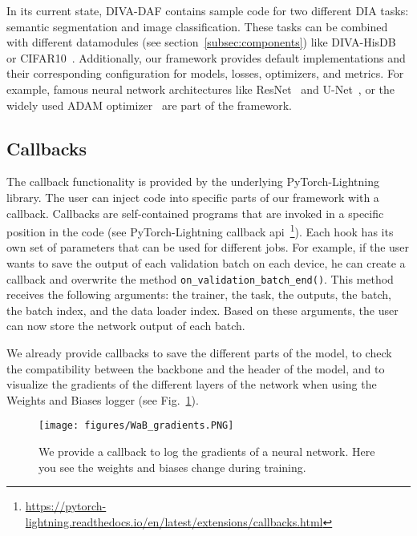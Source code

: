 \documentclass[runningheads]{llncs}
\begin{document}
In its current state, DIVA-DAF contains sample code for two different \acl{DIA} tasks: semantic segmentation and image classification.
These tasks can be combined with different datamodules (see section~\ref{subsec:components}) like DIVA-HisDB~\cite{simistiraDIVAHisDBPreciselyAnnotated2016} or CIFAR10~\cite{krizhevskyLearningMultipleLayers2009}.
Additionally, our framework provides default implementations and their corresponding configuration for models, losses, optimizers, and metrics.
For example, famous neural network architectures like ResNet~\cite{heDeepResidualLearning2016} and U-Net~\cite{ronnebergerUnetConvolutionalNetworks2015}, or the widely used ADAM optimizer~\cite{kingmaAdamMethodStochastic2014} are part of the framework.







\subsection{Callbacks}\label{subsec:callbacks}
The callback functionality is provided by the underlying PyTorch-Lightning~\cite{falconPyTorchLightning2019} library.
The user can inject code into specific parts of our framework with a callback.
Callbacks are self-contained programs that are invoked in a specific position in the code (see PyTorch-Lightning callback api~\footnote{\url{https://pytorch-lightning.readthedocs.io/en/latest/extensions/callbacks.html}}).
Each hook has its own set of parameters that can be used for different jobs.
For example, if the user wants to save the output of each validation batch on each device, he can create a callback and overwrite the method \texttt{on\_validation\_batch\_end()}.
This method receives the following arguments: the trainer, the task, the outputs, the batch, the batch index, and the data loader index.
Based on these arguments, the user can now store the network output of each batch.



We already provide callbacks to save the different parts of the model, to check the compatibility between the backbone and the header of the model, and to visualize the gradients of the different layers of the network when using the Weights and Biases logger (see Fig.~\ref{fig:wandb_gradients}).

\begin{figure}[ht]
    \centering
    \texttt{[image: figures/WaB\_gradients.PNG]}
    \caption{We provide a callback to log the gradients of a neural network. Here you see the weights and biases change during training.
}
    \label{fig:wandb_gradients}
\end{figure}
\end{document}
